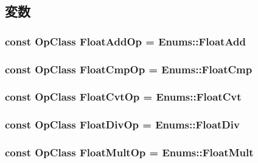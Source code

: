 \subsection{変数}
\hypertarget{op__class_8hh_a32831421adb59741322fa8e7cf58f94b}{
\subsubsection[{FloatAddOp}]{\setlength{\rightskip}{0pt plus 5cm}const OpClass {\bf FloatAddOp} = Enums::FloatAdd}}
\label{op__class_8hh_a32831421adb59741322fa8e7cf58f94b}
\hypertarget{op__class_8hh_ab35872dfd10381e872167d73647309a3}{
\subsubsection[{FloatCmpOp}]{\setlength{\rightskip}{0pt plus 5cm}const OpClass {\bf FloatCmpOp} = Enums::FloatCmp}}
\label{op__class_8hh_ab35872dfd10381e872167d73647309a3}
\hypertarget{op__class_8hh_a928aacdcb8745a6a37db05b7ddbf5ff4}{
\subsubsection[{FloatCvtOp}]{\setlength{\rightskip}{0pt plus 5cm}const OpClass {\bf FloatCvtOp} = Enums::FloatCvt}}
\label{op__class_8hh_a928aacdcb8745a6a37db05b7ddbf5ff4}
\hypertarget{op__class_8hh_aefe3c3e61a9937f10eedfea4e768e2f6}{
\subsubsection[{FloatDivOp}]{\setlength{\rightskip}{0pt plus 5cm}const OpClass {\bf FloatDivOp} = Enums::FloatDiv}}
\label{op__class_8hh_aefe3c3e61a9937f10eedfea4e768e2f6}
\hypertarget{op__class_8hh_aba45bb951b34e95a4ae2eda19d8d78ea}{
\subsubsection[{FloatMultOp}]{\setlength{\rightskip}{0pt plus 5cm}const OpClass {\bf FloatMultOp} = Enums::FloatMult}}
